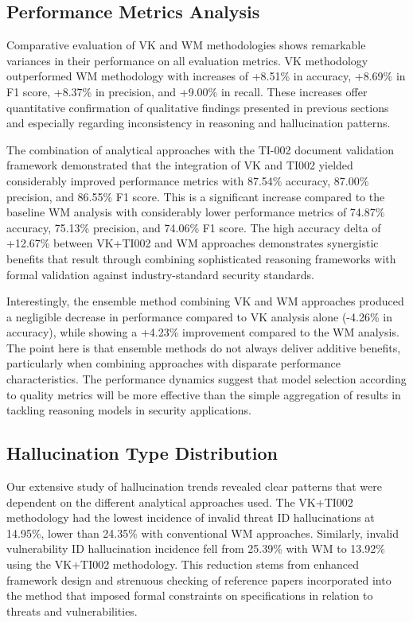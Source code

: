 \documentclass[sigconf]{acmart}
\begin{document}
\subsection{Performance Metrics Analysis}
Comparative evaluation of VK and WM methodologies shows remarkable variances in their performance on all evaluation metrics. VK methodology outperformed WM methodology with increases of +8.51\% in accuracy, +8.69\% in F1 score, +8.37\% in precision, and +9.00\% in recall. These increases offer quantitative confirmation of qualitative findings presented in previous sections and especially regarding inconsistency in reasoning and hallucination patterns.

The combination of analytical approaches with the TI-002 document validation framework demonstrated that the integration of VK and TI002 yielded considerably improved performance metrics with 87.54\% accuracy, 87.00\% precision, and 86.55\% F1 score. This is a significant increase compared to the baseline WM analysis with considerably lower performance metrics of 74.87\% accuracy, 75.13\% precision, and 74.06\% F1 score. The high accuracy delta of +12.67\% between VK+TI002 and WM approaches demonstrates synergistic benefits that result through combining sophisticated reasoning frameworks with formal validation against industry-standard security standards.

Interestingly, the ensemble method combining VK and WM approaches produced a negligible decrease in performance compared to VK analysis alone (-4.26\% in accuracy), while showing a +4.23\% improvement compared to the WM analysis. The point here is that ensemble methods do not always deliver additive benefits, particularly when combining approaches with disparate performance characteristics. The performance dynamics suggest that model selection according to quality metrics will be more effective than the simple aggregation of results in tackling reasoning models in security applications.

\subsection{Hallucination Type Distribution}
Our extensive study of hallucination trends revealed clear patterns that were dependent on the different analytical approaches used. The VK+TI002 methodology had the lowest incidence of invalid threat ID hallucinations at 14.95\%, lower than 24.35\% with conventional WM approaches. Similarly, invalid vulnerability ID hallucination incidence fell from 25.39\% with WM to 13.92\% using the VK+TI002 methodology. This reduction stems from enhanced framework design and strenuous checking of reference papers incorporated into the method that imposed formal constraints on specifications in relation to threats and vulnerabilities.
\end{document}

